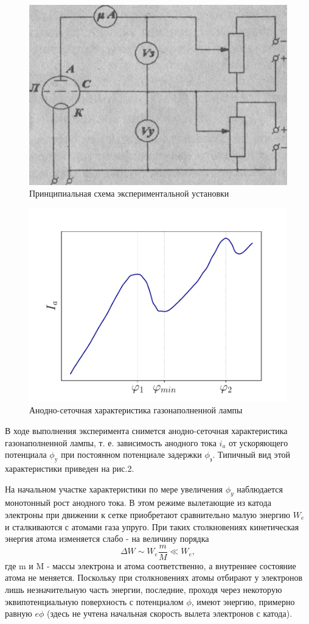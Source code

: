 \begin{center}
    \begin{figure}[h]
        \centering
        \includegraphics[width=0.7\linewidth]{fig/R1.png} 
        
        \caption{Принципиальная схема экспериментальной установки}
        \label{fig:1}
    \end{figure}
    \begin{figure}[h]
        \centering
        \includegraphics[width=0.7\linewidth]{scripts/pic2} 
        \caption{Анодно-сеточная характеристика газонаполненной лампы}
        \label{fig:2}
    \end{figure}
\end{center}

В ходе выполнения эксперимента снимется анодно-сеточная характеристика газонаполненной лампы, т. е. зависимость анодного 
тока $i_a$ от ускоряющего потенциала $\phi_{\text{y}}$ при постоянном потенциале задержки $\phi_{\text{з}}$. Типичный вид этой характеристики приведен на рис.2.

На начальном участке характеристики по мере увеличения $\phi_y$ наблюдается монотонный рост анодного тока. В этом режиме вылетающие из катода электроны при движении к сетке приобретают сравнительно малую энергию $W_e$ и сталкиваются с атомами газа упруго. При таких столкновениях кинетическая энергия атома изменяется слабо - на величину порядка $$\Delta W\sim W_e\frac{m}{M}\ll W_e,$$ где m и M - массы электрона и атома соответственно, а внутреннее состояние атома не меняется. Поскольку при столкновениях атомы отбирают у электронов лишь незначительную часть энергии, последние, проходя через некоторую эквипотенциальную поверхность с потенциалом $\phi$, имеют энергию, примерно равную $e\phi$ (здесь не учтена начальная скорость вылета электронов с катода).

